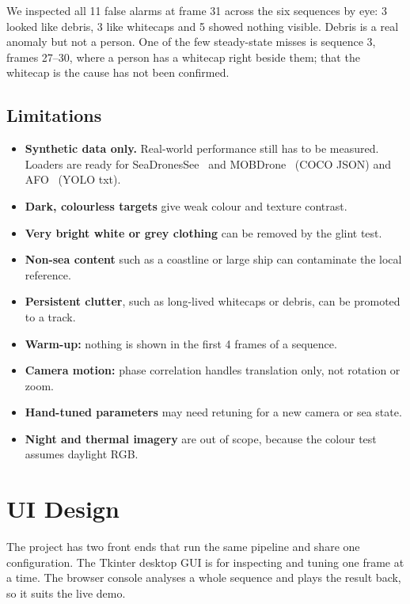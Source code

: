 \documentclass[11pt,a4paper]{article}
\begin{document}
We inspected all 11 false alarms at frame 31 across the six sequences by eye: 3 looked like debris, 3 like whitecaps and 5 showed nothing visible. Debris is a real anomaly but not a person. One of the few steady-state misses is sequence 3, frames 27--30, where a person has a whitecap right beside them; that the whitecap is the cause has not been confirmed.

\subsection{Limitations}

\begin{itemize}
  \item \textbf{Synthetic data only.} Real-world performance still has to be measured. Loaders are ready for SeaDronesSee~\cite{seadronessee} and MOBDrone~\cite{mobdrone} (COCO JSON) and AFO~\cite{afo} (YOLO txt).
  \item \textbf{Dark, colourless targets} give weak colour and texture contrast.
  \item \textbf{Very bright white or grey clothing} can be removed by the glint test.
  \item \textbf{Non-sea content} such as a coastline or large ship can contaminate the local reference.
  \item \textbf{Persistent clutter}, such as long-lived whitecaps or debris, can be promoted to a track.
  \item \textbf{Warm-up:} nothing is shown in the first 4 frames of a sequence.
  \item \textbf{Camera motion:} phase correlation handles translation only, not rotation or zoom.
  \item \textbf{Hand-tuned parameters} may need retuning for a new camera or sea state.
  \item \textbf{Night and thermal imagery} are out of scope, because the colour test assumes daylight RGB.
\end{itemize}

\section{UI Design}

The project has two front ends that run the same pipeline and share one configuration. The Tkinter desktop GUI is for inspecting and tuning one frame at a time. The browser console analyses a whole sequence and plays the result back, so it suits the live demo.
\end{document}
